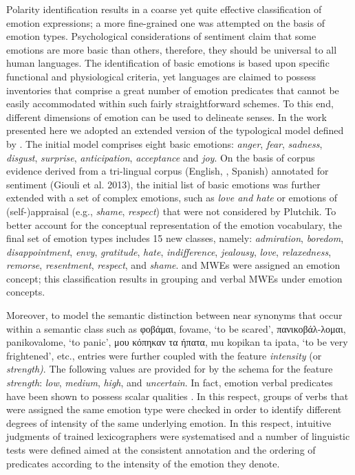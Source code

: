 \documentclass[output=paper]{langsci/langscibook}
\begin{document}
Polarity identification results in a coarse \textendash{} yet quite effective \textendash{}
classification of emotion expressions; a more fine-grained one was
attempted on the basis of emotion types. Psychological considerations
of sentiment claim that some emotions are more basic than others,
therefore, they should be universal to all human languages. The
identification of basic emotions is based upon specific functional and
physiological criteria, yet languages are claimed to possess
inventories that comprise a great number of emotion predicates that
cannot be easily accommodated within such fairly straightforward
schemes. To this end, different dimensions of emotion can be used to
delineate senses. In the work presented here we adopted an extended
version of the typological model defined by \cite{plutchik2001}.  The
initial model comprises eight basic emotions:
\textit{anger}, \textit{fear},
\textit{sadness}, \textit{disgust},
\textit{surprise}, \textit{anticipation},
\textit{acceptance} and \textit{joy}. On the
basis of corpus evidence derived from a tri-lingual corpus (English, , Spanish) annotated for sentiment (Giouli et al. 2013), the
initial list of basic emotions was further extended with a set of
complex emotions, such as \textit{love \textup{and }hate} or
emotions of (self-)appraisal (e.g., \textit{shame},
\textit{respect}) that were not considered by Plutchik. To
better account for the conceptual representation of the emotion
vocabulary, the final set of emotion types includes 15 new classes,
namely: \textit{admiration}, \textit{boredom},
\textit{disappointment}, \textit{envy},
\textit{gratitude}, \textit{hate},
\textit{indifference}, \textit{jealousy},
\textit{love}, \textit{relaxedness},
\textit{remorse}, \textit{resentment},
\textit{respect}, and \textit{shame}.  and 
MWEs were assigned an emotion concept; this classification results in
grouping  and  verbal MWEs under emotion concepts.


Moreover, to model the semantic distinction between near synonyms that
occur within a semantic class such as φοβάμαι, fovame, ‘to
be scared’, πανικοβάλ-λομαι, panikovalome, ‘to panic’,
μου κόπηκαν τα ήπατα, mu kopikan ta ipata, ‘to be very frightened’, etc.,
entries were further coupled with the feature
\textit{intensity }(or\textit{ strength)}. The
following values are provided for by the schema for the feature
\textit{strength}: \textit{low}, \textit{medium},
\textit{high}, and \textit{uncertain}. In fact,
emotion verbal predicates have been shown to possess scalar qualities
\citep{fellbaum2012}. In this respect, groups of verbs
that were assigned the same emotion type were checked in order to
identify different degrees of intensity of the same underlying emotion.
In this respect, intuitive judgments of trained lexicographers were
systematised and a number of linguistic tests were defined aimed at the
consistent annotation and the ordering of predicates according to the
intensity of the emotion they denote.
\end{document}
